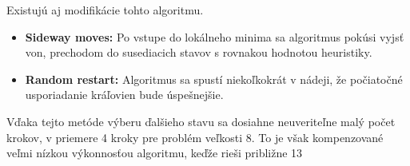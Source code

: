 Existujú aj modifikácie tohto algoritmu.

\begin{itemize}
  \item \textbf{Sideway moves:} Po vstupe do lokálneho minima sa algoritmus pokúsi vyjsť von, prechodom do susediacich stavov s rovnakou hodnotou heuristiky.
  \item \textbf{Random restart:} Algoritmus sa spustí niekoľkokrát v nádeji, že počiatočné usporiadanie kráľovien bude úspešnejšie.
\end{itemize}


Vďaka tejto metóde výberu ďalšieho stavu sa dosiahne neuveriteľne malý počet krokov, v priemere 4 kroky pre problém veľkosti 8. To je však kompenzované veľmi nízkou výkonnosťou algoritmu, keďže rieši približne 13 %

